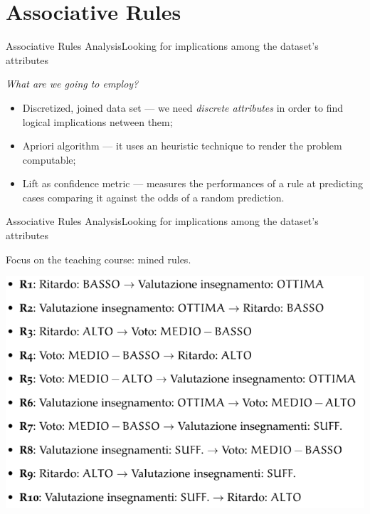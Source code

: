 \section{Associative Rules}

\begin{frame}{Associative Rules Analysis}{Looking for implications among the dataset's attributes}

 \centering\textit{What are we going to employ?} \vspace{0,3cm}

	\begin{block}{}
		\begin{itemize}
			\item<1-> \alert{Discretized, joined data set} --- we need \emph{discrete attributes} in order to find logical implications netween them;
			\item<2-> \alert{Apriori algorithm} --- it uses an heuristic technique to render the problem computable;
			\item<3-> \alert{Lift as confidence metric} --- measures the performances of a rule at predicting cases comparing it against the odds of a random prediction.
		\end{itemize}
	\end{block}

\end{frame}

\begin{frame}{Associative Rules Analysis}{Looking for implications among the dataset's attributes}

    Focus on the \alert{teaching course}: mined rules.

    \vspace{0.5cm}
    \begin{centering}
        \hspace{0.5cm}\includegraphics[scale=0.35]{ass2.png}
    \end{centering}

\end{frame}

